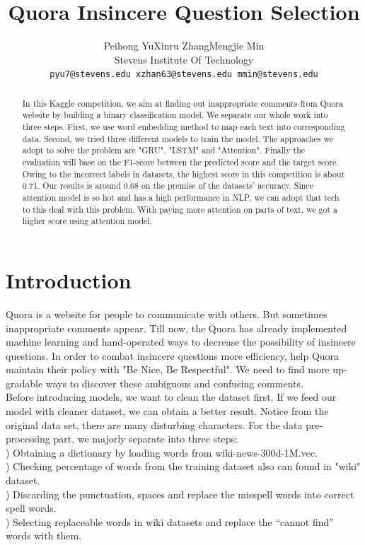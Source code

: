 \documentclass{article}
\title{Quora Insincere Question Selection}
\author{%
  Peihong Yu\quad  Xinru Zhang\quad Mengjie Min\\
  Stevens Institute Of Technology\\
  \texttt{pyu7@stevens.edu\quad
  	xzhan63@stevens.edu\quad
  	mmin@stevens.edu} \\
}
\begin{document}

\maketitle
\begin{abstract}
	In this Kaggle competition, we aim at finding out inappropriate comments from Quora website by building a binary classification model. We separate our whole work into three steps. First, we use word embedding method to map each text into corresponding data. Second, we tried three different models to train the model. The approaches we adopt to solve the problem are "GRU", "LSTM" and "Attention". Finally the evaluation will base on the F1-score between the predicted score and the target score. Owing to the incorrect labels in datasets, the highest score in this competition is about 0.71. Our results is around 0.68 on the premise of  the datasets’ accuracy. Since attention model is so hot and has a high performance in NLP, we can adopt that tech to this deal with this problem. With paying more attention on parts of text, we  got a higher score using attention model.\\
\end{abstract}
\setlength{\parskip}{0.3em}
\section{Introduction}
\noindent Quora is a website for people to communicate with others. But sometimes inappropriate comments appear. Till now, the Quora has already implemented machine learning and hand-operated ways to decrease the possibility of insincere questions. In order to combat insincere questions more efficiency, help Quora maintain their policy with "Be Nice, Be Respectful". We need to find more up-gradable ways to discover these ambiguous and confusing comments.\\

\noindent Before introducing models, we want to clean the dataset first. If we feed our model with cleaner dataset, we can obtain a better result. Notice from the original data set, there are many disturbing characters. For the data pre-processing part, we majorly separate into three steps: \\

) Obtaining a dictionary by loading words from wiki-news-300d-1M.vec. \\
) Checking percentage of words from the training dataset also can found in "wiki" dataset.\\
) Discarding the punctuation, spaces and replace the misspell words into correct spell words.\\
) Selecting replaceable words in wiki datasets and replace the “cannot find” words with them.\\
\end{document}
